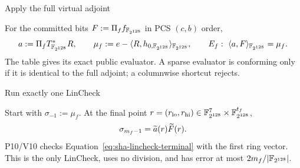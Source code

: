 \begin{pvstep}[2.25in]{Apply the full virtual adjoint}{%
}
\begin{pvexchange}
\end{pvexchange}
For the committed bits $F:=\Pi_f f_{\mathbb F_{2^{128}}}$ in PCS $(c,b)$ order,
\begin{equation}
 a:=\Pi_fT_{\mathbb F_{2^{128}}}^{*}R,\qquad
 \mu_f:=e-\langle R,h_{0,\mathbb F_{2^{128}}}\rangle_{\mathbb F_{2^{128}}},\qquad
 E_f:\ \langle a,F\rangle_{\mathbb F_{2^{128}}}=\mu_f.
 \label{eq:sha-full-adjoint}
\end{equation}
The table gives its exact public evaluator.  A sparse evaluator is conforming
only if it is identical to the full adjoint; a columnwise shortcut rejects.
\end{pvstep}

\begin{pvstep}[2.7in]{Run exactly one LinCheck}{%
}
\begin{pvexchange}
\end{pvexchange}
Start with $\sigma_{-1}:=\mu_f$.  At the final point
$r=(r_{\rm lo},r_{\rm hi})\in\mathbb F_{2^{128}}^7\times\mathbb F_{2^{128}}^{t_f}$,
\begin{equation}
 \sigma_{m_f-1}=\widetilde a(r)\widetilde{F}(r).
 \label{eq:sha-lincheck-terminal}
\end{equation}
P10/V10 checks Equation~\eqref{eq:sha-lincheck-terminal} with the first ring
vector.  This is the only LinCheck, uses no division, and has error at most
$2m_f/|\mathbb F_{2^{128}}|$.
\end{pvstep}

